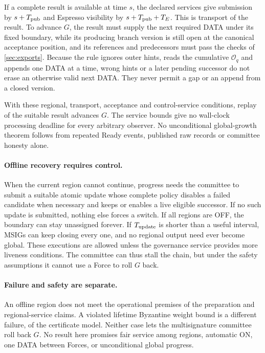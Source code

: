 \documentclass[11pt,a4paper]{article}
\begin{document}
If a complete result is available at time $s$, the declared services give
submission by $s+T_{\rm pub}$ and Espresso visibility by
$s+T_{\rm pub}+T_E$. This is transport of the result. To advance $G$, the
result must supply the next required DATA under its fixed boundary, while
its producing branch version is still open at the canonical acceptance
position, and its references and predecessors must pass the checks of
\cref{sec:exports}. Because the rule ignores outer hints, reads the
cumulative $\mathcal O_q$ and appends one DATA at a time, wrong hints or
a later pending successor do not erase an otherwise valid next DATA. They never permit a gap or an append from a
closed version.

With these regional, transport, acceptance and control-service
conditions, replay of the suitable result advances $G$. The service
bounds give no wall-clock processing deadline for every arbitrary
observer. No unconditional global-growth theorem follows from repeated
Ready events, published raw records or committee honesty alone.

\paragraph{Offline recovery requires control.}
When the current region cannot continue, progress needs the committee to
submit a suitable atomic update whose complete policy disables a failed
candidate when necessary and keeps or enables a live eligible successor.
If no such update is
submitted, nothing else forces a switch. If all regions are OFF, the
boundary can stay unassigned forever. If $T_{\rm update}$ is shorter than
a useful interval, MSIGs can keep closing every one, and no regional
output need ever become global. These executions
are allowed unless the governance service provides more liveness
conditions. The committee can thus stall the chain, but under the
safety assumptions it cannot use a Force to roll $G$ back.

\paragraph{Failure and safety are separate.}
An offline region does not meet the operational premises of the
preparation and regional-service claims. A violated lifetime Byzantine
weight bound is a different failure, of the certificate model. Neither
case lets the multisignature committee roll back $G$. No result here
promises fair service among regions, automatic ON, one DATA between
Forces, or unconditional global progress.
\end{document}

